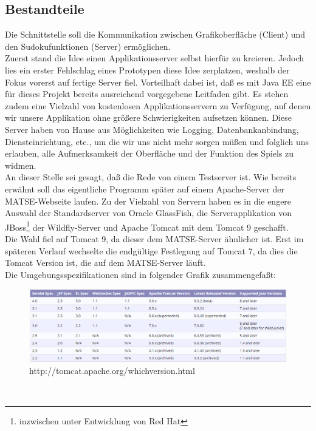 \documentclass[a4paper,12pt]{scrreprt}
\begin{document}
	\subsection{Bestandteile}
	Die Schnittstelle soll die Kommunikation zwischen Grafikoberfl\"ache (Client) und den
	Sudokufunktionen (Server) erm\"oglichen.\medskip \\
	Zuerst stand die Idee einen Applikationsserver selbst hierf\"ur zu kreieren. Jedoch lies ein
	erster Fehlschlag eines Prototypen diese Idee zerplatzen, weshalb der Fokus vorerst auf fertige
	Server fiel. Vorteilhaft dabei ist, da{\ss} es mit Java EE eine f\"ur dieses Projekt bereits
	ausreichend vorgegebene Leitfaden gibt. Es stehen zudem eine Vielzahl von kostenlosen
	Applikationsservern zu Verf\"ugung, auf denen wir unsere Applikation ohne gr\"o{\ss}ere
	Schwierigkeiten aufsetzen k\"onnen. Diese Server haben von Hause aus M\"oglichkeiten wie
	Logging, Datenbankanbindung, Diensteinrichtung, etc., um die wir uns nicht mehr sorgen
	m\"u{\ss}en und folglich uns erlauben, alle Aufmerksamkeit der Oberfl\"ache und der Funktion
	des Spiels zu widmen.\medskip \\
	An dieser Stelle sei gesagt, da{\ss} die Rede von einem Testserver ist. Wie bereits erw\"ahnt soll
	das eigentliche Programm sp\"ater auf einem Apache-Server der MATSE-Webseite laufen. Zu der
	Vielzahl von Servern haben es in die engere Auswahl der Standardserver von Oracle GlassFish,
	die Serverapplikation von JBoss\footnote{inzwischen unter Entwicklung von Red Hat} der
	Wildfly-Server und Apache Tomcat mit dem Tomcat 9 geschafft.\medskip \\
	Die Wahl fiel auf Tomcat 9, da dieser dem MATSE-Server \"ahnlicher ist. Erst im sp\"ateren Verlauf
	wechselte die endg\"ultige Festlegung auf Tomcat 7, da dies die Tomcat Version ist, die auf dem
	MATSE-Server l\"auft.\medskip \\
	Die Umgebungsspezifikationen sind in folgender Grafik zusammengefa{\ss}t:
	\begin{figure}[h]
		\includegraphics[scale=0.55]{pictures/Tomcat-Versionsvergleich}
		\caption{http://tomcat.apache.org/whichversion.html}
	\end{figure}\\
\end{document}
